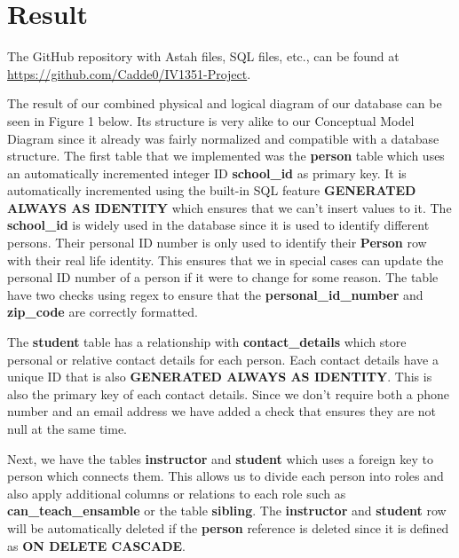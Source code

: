 \documentclass[a4paper]{scrartcl}
\begin{document}
\section{Result}

The GitHub repository with Astah files, SQL files, etc., can be found at \url{https://github.com/Cadde0/IV1351-Project}.

The result of our combined physical and logical diagram of our database can be seen in Figure 1 below. Its structure is very alike to our Conceptual Model Diagram since it already was fairly normalized and compatible with a database structure. The first table that we implemented was the \textbf{person} table which uses an automatically incremented integer ID \textbf{school\_id} as primary key. It is automatically incremented using the built-in SQL feature \textbf{GENERATED ALWAYS AS IDENTITY} which ensures that we can't insert values to it. The \textbf{school\_id} is widely used in the database since it is used to identify different persons. Their personal ID number is only used to identify their \textbf{Person} row with their real life identity. This ensures that we in special cases can update the personal ID number of a person if it were to change for some reason. The table have two checks using regex to ensure that the \textbf{personal\_id\_number} and \textbf{zip\_code} are correctly formatted.

The \textbf{student} table has a relationship with \textbf{contact\_details} which store personal or relative contact details for each person. Each contact details have a unique ID that is also \textbf{GENERATED ALWAYS AS IDENTITY}. This is also the primary key of each contact details. Since we don't require both a phone number and an email address we have added a check that ensures they are not null at the same time.

Next, we have the tables \textbf{instructor} and \textbf{student} which uses a foreign key to person which connects them. This allows us to divide each person into roles and also apply additional columns or relations to each role such as \textbf{can\_teach\_ensamble} or the table \textbf{sibling}. The \textbf{instructor} and \textbf{student} row will be automatically deleted if the \textbf{person} reference is deleted since it is defined as \textbf{ON DELETE CASCADE}.
\end{document}
